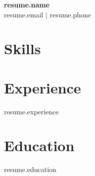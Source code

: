 \documentclass{article}
\begin{document}
\begin{center}
    {\Huge \textbf{ {{ resume.name }} }} \\
    {\large {{ resume.email }} | {{ resume.phone }} }
\end{center}

\section*{Skills}

\section*{Experience}
{{ resume.experience }}

\section*{Education}
{{ resume.education }}
\end{document}
